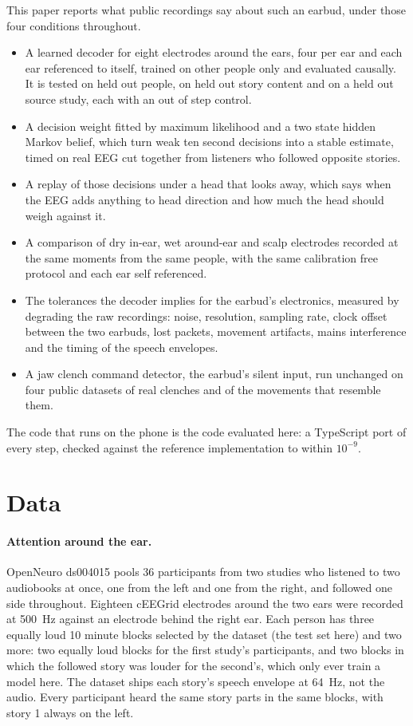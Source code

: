 \documentclass[11pt]{article}
\begin{document}
This paper reports what public recordings say about such an earbud, under those four conditions throughout.
\begin{itemize}
\item A learned decoder for eight electrodes around the ears, four per ear and each ear referenced to itself, trained on other people only and evaluated causally. It is tested on held out people, on held out story content and on a held out source study, each with an out of step control.
\item A decision weight fitted by maximum likelihood and a two state hidden Markov belief, which turn weak ten second decisions into a stable estimate, timed on real EEG cut together from listeners who followed opposite stories.
\item A replay of those decisions under a head that looks away, which says when the EEG adds anything to head direction and how much the head should weigh against it.
\item A comparison of dry in-ear, wet around-ear and scalp electrodes recorded at the same moments from the same people, with the same calibration free protocol and each ear self referenced.
\item The tolerances the decoder implies for the earbud's electronics, measured by degrading the raw recordings: noise, resolution, sampling rate, clock offset between the two earbuds, lost packets, movement artifacts, mains interference and the timing of the speech envelopes.
\item A jaw clench command detector, the earbud's silent input, run unchanged on four public datasets of real clenches and of the movements that resemble them.
\end{itemize}
The code that runs on the phone is the code evaluated here: a TypeScript port of every step, checked against the reference implementation to within $10^{-9}$.

\section{Data}

\paragraph{Attention around the ear.} OpenNeuro ds004015 \cite{ds004015,holtze2022} pools 36 participants from two studies \cite{jaeger2020,holtze2021} who listened to two audiobooks at once, one from the left and one from the right, and followed one side throughout. Eighteen cEEGrid electrodes around the two ears were recorded at 500~Hz against an electrode behind the right ear. Each person has three equally loud 10 minute blocks selected by the dataset (the test set here) and two more: two equally loud blocks for the first study's participants, and two blocks in which the followed story was louder for the second's, which only ever train a model here. The dataset ships each story's speech envelope at 64~Hz, not the audio. Every participant heard the same story parts in the same blocks, with story 1 always on the left.
\end{document}
